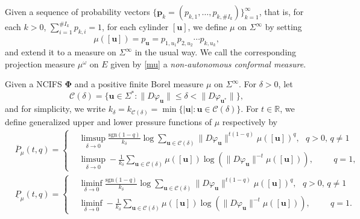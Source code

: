 \documentclass[12pt]{amsart}
\theoremstyle{plain}
\theoremstyle{definition}
\theoremstyle{remark}
\newcommand{\bu}{\mathbf{u}}
\begin{document}
Given a sequence of probability vectors $\{\mathbf{p}_k=(p_{k, 1}, \ldots, p_{k, \#I_k})\}_{k=1}^\infty$, that is,  for each  $k>0$,  $\sum_{i=1}^{\#I_k}p_{k, i}=1$, for each cylinder $[\bu]$, we   define $\mu$ on $\Sigma^\infty$ by setting
\begin{equation}\label{b m}
\mu([\bu])=p_\mathbf{u}=p_{1, u_1}p_{2, u_2}\cdots p_{k, u_k},
\end{equation}
 and extend it  to  a measure on $\Sigma^\infty$ in the usual way. We call the corresponding  projection measure $\mu^\omega$ on $E$ given by \eqref{mu}  a \emph{ non-autonomous conformal measure}.  



Given a NCIFS $\boldsymbol{\Phi}$ and a positive finite Borel measure $\mu$ on $\Sigma^\infty$. For  $\delta>0$, let
$$
\mathcal{C}(\delta)=\{\mathbf{u}\in\Sigma^*: \|D\varphi_\mathbf{u}\|\le \delta< \|D\varphi_{\mathbf{u}^*}\| \},
$$
and for simplicity, we write $k_{\delta}= k_{\mathcal{C}(\delta)}=\min\{|\mathbf{u}|:\mathbf{u}\in\mathcal{C}(\delta)\}.$
  For $t\in \mathbb{R}$, we define generalized upper and lower pressure functions of $\mu$ respectively by    
\begin{equation}\label{def_GULPF}
\begin{split}
&\overline P_\mu(t, q)=\left\{ \begin{aligned} &\limsup_{\delta\to 0} \frac{\mathrm{sgn}(1-q)}{k_{\delta}}\log \sum_{\mathbf{u}\in\mathcal{C}(\delta)}\|D\varphi_\mathbf{u}\|^{t(1-q)}\mu([\bu])^q ,  \textit{  $q>0$, $q\not=1$}   \\
&\limsup_{\delta\to 0} -\frac{1}{k_{\delta}} \sum_{\mathbf{u}\in\mathcal{C}(\delta)}\mu([\bu])\log(\|D\varphi_\mathbf{u}\|^{-t}\mu([\bu])), \hspace{1cm}q=1,
\end{aligned} \right.   \\
&\underline P_\mu(t, q)=\left\{ \begin{aligned} & \liminf_{\delta\to 0} \frac{\mathrm{sgn}(1-q)}{k_{\delta}}\log \sum_{\mathbf{u}\in\mathcal{C}(\delta)}\|D\varphi_\mathbf{u}\|^{t(1-q)}\mu([\bu])^q ,  \textit{  $q>0$, $q\not=1$}   \\
&\liminf_{\delta\to 0} -\frac{1}{k_{\delta}} \sum_{\mathbf{u}\in\mathcal{C}(\delta)}\mu([\bu])\log(\|D\varphi_\mathbf{u}\|^{-t}\mu([\bu])), \hspace{1cm} q=1.
\end{aligned} \right.
\end{split}
\end{equation}    
\end{document}
